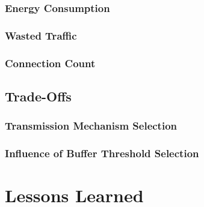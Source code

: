 \subsubsection*{Energy Consumption}
\subsubsection*{Wasted Traffic}
\subsubsection*{Connection Count}

\subsection{Trade-Offs}
\subsubsection*{Transmission Mechanism Selection}
\subsubsection*{Influence of Buffer Threshold Selection}

\section{Lessons Learned}
